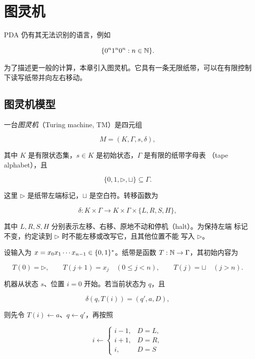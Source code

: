 \chapter{图灵机}
\label{chap:turing-machines}

\lecture
\label{lec:turing-machines}

PDA 仍有其无法识别的语言，例如

\[
  \{0^n1^n0^n:n\in\mathbb{N}\}.
\]

为了描述更一般的计算，本章引入图灵机。它具有一条无限纸带，可以在有限控制
下读写纸带并向左右移动。

\section{图灵机模型}

\begin{definition}[图灵机]
  \label{def:turing-machine}
  一台\emph{图灵机}（Turing machine, TM）是四元组

  \[
    M=(K,\Gamma,s,\delta),
  \]

  其中 $K$ 是有限状态集，$s\in K$ 是初始状态，$\Gamma$ 是有限的纸带字母表
  （tape alphabet），且

  \[
    \{0,1,\triangleright,\sqcup\}\subseteq\Gamma.
  \]

  这里 $\triangleright$ 是纸带左端标记，$\sqcup$ 是空白符。转移函数为

  \[
    \delta:K\times\Gamma
      \longrightarrow K\times\Gamma\times\{L,R,S,H\},
  \]

  其中 $L,R,S,H$ 分别表示左移、右移、原地不动和停机（halt）。为保持左端
  标记不变，约定读到 $\triangleright$ 时不能左移或改写它，且其他位置不能
  写入 $\triangleright$。
\end{definition}

设输入为 $x=x_0x_1\cdots x_{n-1}\in\{0,1\}^{*}$。纸带是函数
$T:\mathbb{N}\to\Gamma$，其初始内容为

\[
  T(0)=\triangleright,
  \qquad
  T(j+1)=x_j\quad(0\le j<n),
  \qquad
  T(j)=\sqcup\quad(j>n).
\]

机器从状态 $s$、位置 $i=0$ 开始。若当前状态为 $q$，且

\[
  \delta(q,T(i))=(q',a,D),
\]

则先令 $T(i)\gets a$、$q\gets q'$，再按照

\[
  i\gets
  \begin{cases}
    i-1,&D=L,\\
    i+1,&D=R,\\
    i,&D=S
  \end{cases}
\]

